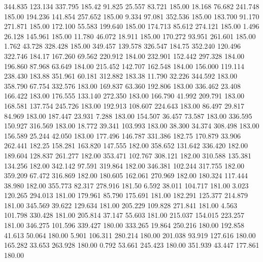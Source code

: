  344.835  123.134  337.795       185.42
  91.825   25.557   83.721       185.00
  18.168   76.682  241.748       185.00
 194.236  141.854  257.652       185.00
   9.334   97.081  352.536       185.00
 183.700   91.170  271.871       185.00
 172.100   55.583  199.640       185.00
 174.713   85.612  274.121       185.00
   1.496   26.128  145.961       185.00
  11.780   46.072   18.911       185.00
 170.272   93.951  261.601       185.00
   1.762   43.728  328.428       185.00
 349.457  139.578  326.547       184.75
 352.240  120.496  322.746       184.17
 167.260   69.562  220.912       184.00
 232.901  152.442  297.328       184.00
 196.860   87.968   63.649       184.00
 215.452  142.707  162.548       184.00
 156.000  119.114  238.430       183.88
 351.961   60.181  312.882       183.38
  11.790   32.226  344.592       183.00
 358.790   67.754  332.576       183.00
 169.837   63.360  192.806       183.00
 336.462   23.408  166.422       183.00
 176.555  133.140  272.350       183.00
 166.790   41.992  209.791       183.00
 168.581  137.754  245.726       183.00
 192.913  108.607  224.643       183.00
  86.497   29.817   84.969       183.00
 187.447   23.931    7.288       183.00
 154.507   36.457   73.587       183.00
 336.595  150.927  316.569       183.00
  18.772   39.341  103.993       183.00
  38.300   34.374  308.498       183.00
 156.589   25.244   42.050       183.00
 177.496  146.787  331.386       182.75
 170.879   33.906  262.441       182.25
 158.281  163.820  147.555       182.00
 358.652  131.642  336.420       182.00
 189.604  128.837  261.277       182.00
 353.471  102.767  308.121       182.00
 310.588  135.381  134.256       182.00
 342.142   97.591  319.864       182.00
 346.381  102.244  317.755       182.00
 359.209   67.472  316.869       182.00
 180.605  162.061  270.969       182.00
 180.324  117.444   38.980       182.00
 355.773   82.317  278.916       181.50
   6.592   38.011  104.717       181.00
   3.023  120.265  294.013       181.00
 179.961   85.790  175.691       181.00
 182.291  125.377  214.879       181.00
 345.569   39.622  129.634       181.00
 205.229  109.828  271.841       181.00
   4.563  101.798  330.428       181.00
 205.814   37.147   55.603       181.00
 215.037  154.015  223.257       181.00
 346.275  101.596  339.427       180.00
 333.265   19.864  250.216       180.00
 192.858   41.613   50.064       180.00
   5.901  106.311  280.214       180.00
 201.038   93.919  127.616       180.00
 165.282   33.653  263.928       180.00
   0.792   53.661  245.423       180.00
 351.939   43.447  177.861       180.00
